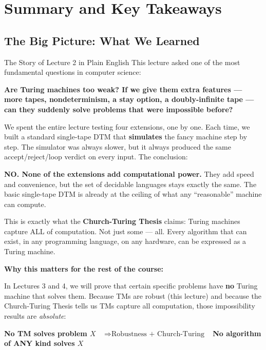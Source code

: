 \section{Summary and Key Takeaways}

\subsection{The Big Picture: What We Learned}

\begin{conceptbox}{The Story of Lecture 2 in Plain English}
This lecture asked one of the most fundamental questions in computer science:

\textbf{Are Turing machines too weak? If we give them extra features --- more tapes, nondeterminism, a stay option, a doubly-infinite tape --- can they suddenly solve problems that were impossible before?}

We spent the entire lecture testing four extensions, one by one. Each time, we built a standard single-tape DTM that \textbf{simulates} the fancy machine step by step. The simulator was always slower, but it always produced the same accept/reject/loop verdict on every input. The conclusion:

\textbf{NO. None of the extensions add computational power.} They add speed and convenience, but the set of decidable languages stays exactly the same. The basic single-tape DTM is already at the ceiling of what any ``reasonable'' machine can compute.

This is exactly what the \textbf{Church-Turing Thesis} claims: Turing machines capture ALL of computation. Not just some --- all. Every algorithm that can exist, in any programming language, on any hardware, can be expressed as a Turing machine.

\textbf{Why this matters for the rest of the course:}

In Lectures 3 and 4, we will prove that certain specific problems have \textbf{no} Turing machine that solves them. Because TMs are robust (this lecture) and because the Church-Turing Thesis tells us TMs capture all computation, those impossibility results are \emph{absolute}:

\begin{center}
\textbf{No TM solves problem $X$}
$\;\;\Rightarrow{\text{Robustness + Church-Turing}}\;\;$
\textbf{No algorithm of ANY kind solves $X$}
\end{center}

\end{conceptbox}

